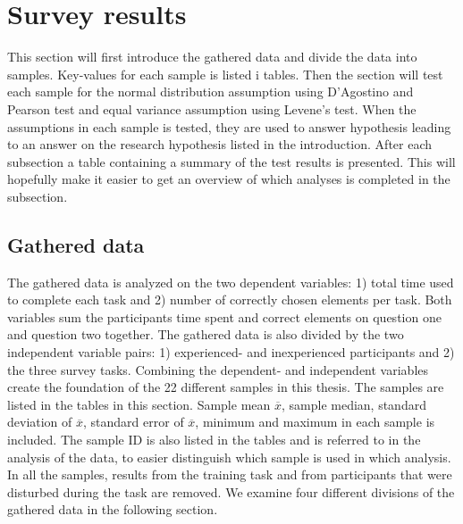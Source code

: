\section{Survey results}\label{sec:survey_results}
This section will first introduce the gathered data and divide the data into samples. Key-values for each sample is listed i tables. Then the section will test each sample for the normal distribution assumption using D'Agostino and Pearson test and equal variance assumption using Levene's test. When the assumptions in each sample is tested, they are used to answer hypothesis leading to an answer on the research hypothesis listed in the introduction. After each subsection a table containing a summary of the test results is presented. This will hopefully make it easier to get an overview of which analyses is completed in the subsection.   

\subsection{Gathered data}\label{sec:gathereddata}
The gathered data is analyzed on the two dependent variables: 1) total time used to complete each task and 2) number of correctly chosen elements per task. Both variables sum the participants time spent and correct elements on question one and question two together. The gathered data is also divided by the two independent variable pairs: 1) experienced- and inexperienced participants and 2) the three survey tasks. Combining the dependent- and independent variables create the foundation of the 22 different samples in this thesis. The samples are listed in the tables in this section. Sample mean $\overline{x}$, sample median, standard deviation of $\overline{x}$, standard error of $\overline{x}$, minimum and maximum in each sample is included. The sample ID is also listed in the tables and is referred to in the analysis of the data, to easier distinguish which sample is used in which analysis. In all the samples, results from the training task and from participants that were disturbed during the task are removed. We examine four different divisions of the gathered data in the following section.

